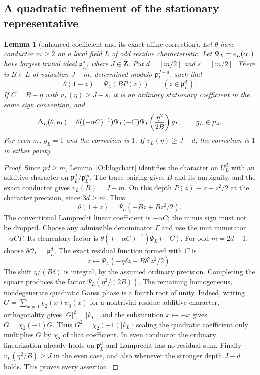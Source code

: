 \documentclass[11pt]{amsart}
\newtheorem{lemma}[theorem]{Lemma}
\theoremstyle{definition}
\theoremstyle{remark}
\newcommand{\ceil}[1]{\left\lceil #1\right\rceil}
\newcommand{\floor}[1]{\left\lfloor #1\right\rfloor}
\newcommand{\OO}{\mathcal O}\newcommand{\pp}{\mathfrak p}\newcommand{\PP}{\mathfrak P}
\begin{document}
\subsection{A quadratic refinement of the stationary representative}
\begin{lemma}[enhanced coefficient and its exact affine correction]
\label{O:I:enhanced}
Let $\theta$ have conductor $m\ge2$ on a local field $L$ of odd residue
characteristic. Let $\Psi_L=\mathrm e_L(\alpha\,\cdot)$ have largest trivial
ideal $\pp_L^J$, where $J\in\mathbf Z$. Put $d=\floor{m/2}$ and $s=\ceil{m/2}$.
There is $B\in L$ of valuation $J-m$, determined modulo $\pp_L^{J-d}$,
such that
\begin{equation}\label{O:I:enhancedformula}
 \theta(1-z)=\Psi_L(BP(z))\qquad(z\in\pp_L^d).
\end{equation}
If $C=B+\eta$ with $v_L(\eta)\ge J-s$, it is an ordinary stationary
coefficient in the same sign convention, and
\begin{equation}\label{O:I:completeformula}
 \Delta_L(\theta,\mathrm e_L)=
 \theta((-\alpha C)^{-1})\Psi_L(-C)
 \Psi_L\!\left(\frac{\eta^2}{2B}\right)g_L,
 \qquad g_L\in\mu_4.
\end{equation}
For even $m$, $g_L=1$ and the correction is $1$.
If $v_L(\eta)\ge J-d$, the correction is $1$ in either parity.
\end{lemma}
\begin{proof}
Since $pd\ge m$, Lemma~\ref{O:I:logchart} identifies the character on $U_L^d$
with an additive character on $\pp_L^d/\pp_L^m$. The trace pairing gives
$B$ and its ambiguity, and the exact conductor gives $v_L(B)=J-m$.
On this depth $P(z)\equiv z+z^2/2$ at the character precision, since
$3d\ge m$. Thus
\[
 \theta(1+z)=\Psi_L(-Bz+Bz^2/2).
\]
The conventional Lamprecht linear coefficient is $-\alpha C$; the minus
sign must not be dropped. Choose any admissible denominator $\Gamma$ and
use the unit numerator $-\alpha C\Gamma$. Its elementary factor is
$\theta((-\alpha C)^{-1})\Psi_L(-C)$.
For odd $m=2d+1$, choose $\delta\OO_L=\pp_L^d$. The exact residual
function formed with $C$ is
\[
 \bar z\longmapsto
 \Psi_L(-\eta\delta z-B\delta^2z^2/2).
\]
The shift $\eta/(B\delta)$ is integral, by the assumed ordinary precision.
Completing the square produces the factor
$\Psi_L(\eta^2/(2B))$. The remaining homogeneous, nondegenerate quadratic
Gauss phase is a fourth root of unity. Indeed, writing
$G=\sum_{x\ne0}\chi_2(x)\psi_0(x)$ for a nontrivial residue additive
character, orthogonality gives $|G|^2=|k_L|$, and the substitution
$x\mapsto-x$ gives $\overline G=\chi_2(-1)G$.
Thus $G^2=\chi_2(-1)|k_L|$; scaling the quadratic coefficient only
multiplies $G$ by $\chi_2$ of that coefficient. In even conductor the ordinary
linearization already holds on $\pp_L^d$ and Lamprecht has no residual sum.
Finally $v_L(\eta^2/B)\ge J$ in the even case, and also whenever the
stronger depth $J-d$ holds. This proves every assertion.
\end{proof}
\end{document}
